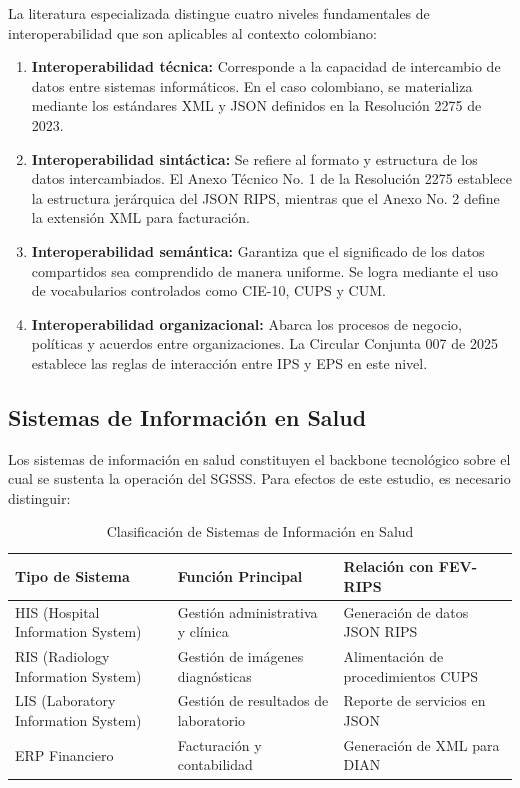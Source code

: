 \documentclass[12pt,letterpaper]{report}
\begin{document}
La literatura especializada distingue cuatro niveles fundamentales de interoperabilidad que son aplicables al contexto colombiano:

\begin{enumerate}[label=\alph*)]
    \item \textbf{Interoperabilidad técnica:} Corresponde a la capacidad de intercambio de datos entre sistemas informáticos. En el caso colombiano, se materializa mediante los estándares XML y JSON definidos en la Resolución 2275 de 2023.
    
    \item \textbf{Interoperabilidad sintáctica:} Se refiere al formato y estructura de los datos intercambiados. El Anexo Técnico No. 1 de la Resolución 2275 establece la estructura jerárquica del JSON RIPS, mientras que el Anexo No. 2 define la extensión XML para facturación.
    
    \item \textbf{Interoperabilidad semántica:} Garantiza que el significado de los datos compartidos sea comprendido de manera uniforme. Se logra mediante el uso de vocabularios controlados como CIE-10, CUPS y CUM.
    
    \item \textbf{Interoperabilidad organizacional:} Abarca los procesos de negocio, políticas y acuerdos entre organizaciones. La Circular Conjunta 007 de 2025 establece las reglas de interacción entre IPS y EPS en este nivel.
\end{enumerate}

\subsection{Sistemas de Información en Salud}

Los sistemas de información en salud constituyen el backbone tecnológico sobre el cual se sustenta la operación del SGSSS. Para efectos de este estudio, es necesario distinguir:

\begin{table}[H]
\centering
\caption{Clasificación de Sistemas de Información en Salud}
\label{tab:sistemas}
\begin{tabular}{@{}p{4cm}p{5cm}p{5cm}@{}}
\toprule
\textbf{Tipo de Sistema} & \textbf{Función Principal} & \textbf{Relación con FEV-RIPS} \\
\midrule
HIS (Hospital Information System) & Gestión administrativa y clínica & Generación de datos JSON RIPS \\
RIS (Radiology Information System) & Gestión de imágenes diagnósticas & Alimentación de procedimientos CUPS \\
LIS (Laboratory Information System) & Gestión de resultados de laboratorio & Reporte de servicios en JSON \\
ERP Financiero & Facturación y contabilidad & Generación de XML para DIAN \\
\bottomrule
\end{tabular}
\end{table}
\end{document}
